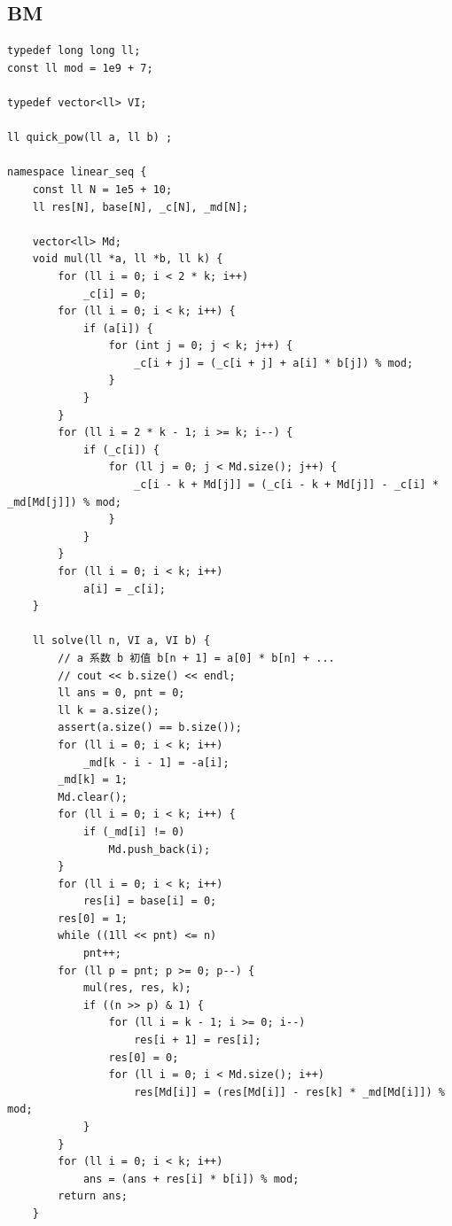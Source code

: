 \documentclass[twoside]{article}
\begin{document}
\subsection{BM}
\begin{lstlisting}
typedef long long ll;
const ll mod = 1e9 + 7;

typedef vector<ll> VI;

ll quick_pow(ll a, ll b) ;

namespace linear_seq {
    const ll N = 1e5 + 10;
    ll res[N], base[N], _c[N], _md[N];

    vector<ll> Md;
    void mul(ll *a, ll *b, ll k) {
        for (ll i = 0; i < 2 * k; i++)
            _c[i] = 0;
        for (ll i = 0; i < k; i++) {
            if (a[i]) {
                for (int j = 0; j < k; j++) {
                    _c[i + j] = (_c[i + j] + a[i] * b[j]) % mod;
                }
            }
        }
        for (ll i = 2 * k - 1; i >= k; i--) {
            if (_c[i]) {
                for (ll j = 0; j < Md.size(); j++) {
                    _c[i - k + Md[j]] = (_c[i - k + Md[j]] - _c[i] * _md[Md[j]]) % mod;
                }
            }
        }
        for (ll i = 0; i < k; i++)
            a[i] = _c[i];
    }

    ll solve(ll n, VI a, VI b) {
        // a 系数 b 初值 b[n + 1] = a[0] * b[n] + ...
        // cout << b.size() << endl;
        ll ans = 0, pnt = 0;
        ll k = a.size();
        assert(a.size() == b.size());
        for (ll i = 0; i < k; i++)
            _md[k - i - 1] = -a[i];
        _md[k] = 1;
        Md.clear();
        for (ll i = 0; i < k; i++) {
            if (_md[i] != 0)
                Md.push_back(i);
        }
        for (ll i = 0; i < k; i++)
            res[i] = base[i] = 0;
        res[0] = 1;
        while ((1ll << pnt) <= n)
            pnt++;
        for (ll p = pnt; p >= 0; p--) {
            mul(res, res, k);
            if ((n >> p) & 1) {
                for (ll i = k - 1; i >= 0; i--)
                    res[i + 1] = res[i];
                res[0] = 0;
                for (ll i = 0; i < Md.size(); i++)
                    res[Md[i]] = (res[Md[i]] - res[k] * _md[Md[i]]) % mod;
            }
        }
        for (ll i = 0; i < k; i++)
            ans = (ans + res[i] * b[i]) % mod;
        return ans;
    }


\end{lstlisting}
\end{document}
